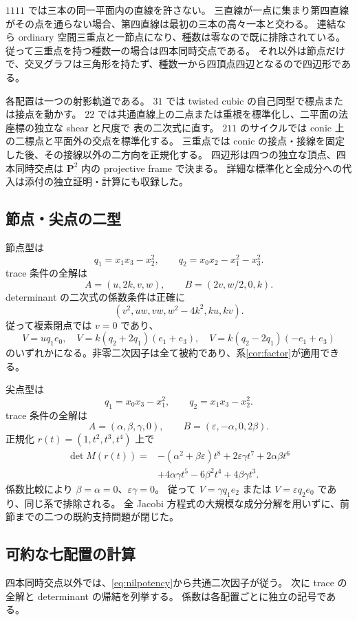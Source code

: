 \documentclass[11pt,a4paper]{ltjsarticle}
\newcommand{\PP}{\mathbf P}\renewcommand{\AA}{\mathbf A}
\theoremstyle{remark}\newtheorem{remark}[theorem]{注意}
\begin{document}
$1111$ では三本の同一平面内の直線を許さない。
三直線が一点に集まり第四直線がその点を通らない場合、第四直線は最初の三本の高々一本と交わる。
連結なら ordinary 空間三重点と一節点になり、種数は零なので既に排除されている。
従って三重点を持つ種数一の場合は四本同時交点である。
それ以外は節点だけで、交叉グラフは三角形を持たず、種数一から四頂点四辺となるので四辺形である。

各配置は一つの射影軌道である。
$31$ では twisted cubic の自己同型で標点または接点を動かす。
$22$ では共通直線上の二点または重根を標準化し、二平面の法座標の独立な shear と尺度で
表の二次式に直す。
$211$ のサイクルでは conic 上の二標点と平面外の交点を標準化する。
三重点では conic の接点・接線を固定した後、その接線以外の二方向を正規化する。
四辺形は四つの独立な頂点、四本同時交点は $\PP^2$ 内の projective frame で決まる。
詳細な標準化と全成分への代入は添付の独立証明・計算にも収録した。

\subsection{節点・尖点の二型}

節点型は
\[
q_1=x_1x_3-x_2^2,\qquad q_2=x_0x_2-x_1^2-x_3^2.
\]
trace 条件の全解は
\[
A=(u,2k,v,w),\qquad B=(2v,w/2,0,k).
\]
determinant の二次式の係数条件は正確に
\[
(v^2,uw,vw,w^2-4k^2,ku,kv).
\]
従って複素閉点では $v=0$ であり、
\[
V=u q_1e_0,\quad V=k(q_2+2q_1)(e_1+e_3),\quad
V=k(q_2-2q_1)(-e_1+e_3)
\]
のいずれかになる。非零二次因子は全て被約であり、系\ref{cor:factor}が適用できる。

尖点型は
\[
q_1=x_0x_3-x_1^2,\qquad q_2=x_1x_3-x_2^2.
\]
trace 条件の全解は
\[
A=(\alpha,\beta,\gamma,0),\qquad B=(\varepsilon,-\alpha,0,2\beta).
\]
正規化 $r(t)=(1,t^2,t^3,t^4)$ 上で
\[
\begin{aligned}
\det M(r(t))={}&-(\alpha^2+\beta\varepsilon)t^8
+2\varepsilon\gamma t^7+2\alpha\beta t^6\\
&+4\alpha\gamma t^5-6\beta^2t^4+4\beta\gamma t^3.
\end{aligned}
\]
係数比較により $\beta=\alpha=0$、$\varepsilon\gamma=0$。
従って $V=\gamma q_1e_2$ または $V=\varepsilon q_2e_0$ であり、同じ系で排除される。
全 Jacobi 方程式の大規模な成分分解を用いずに、前節までの二つの既約支持問題が閉じた。

\subsection{可約な七配置の計算}

四本同時交点以外では、\eqref{eq:nilpotency}から共通二次因子が従う。
次に trace の全解と determinant の帰結を列挙する。
係数は各配置ごとに独立の記号である。
\end{document}
